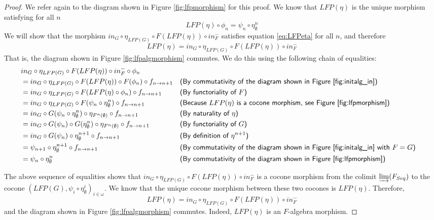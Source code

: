 \documentclass{msthesis}
\theoremstyle{definition}
\newcommand{\colim}{\varinjlim}
\begin{document}
\begin{proof}
    We refer again to the diagram shown in Figure \ref{fig:lfpmorphism} for this proof.  We know that $LFP(\eta)$ is the unique morphism satisfying for all $n$
    \begin{equation}
    \label{eq:LFPeta}      
 LFP(\eta) \circ \phi_n = \psi_n \circ \eta^n_\emptyset
     \end{equation}
    We will show that the morphism $in_G \circ \eta_{LFP(G)} \circ F(LFP(\eta)) \circ in^-_F$ satisfies equation \eqref{eq:LFPeta} for all $n$, and therefore
    \[ LFP(\eta) = in_G \circ \eta_{LFP(G)} \circ F(LFP(\eta)) \circ in^-_F \]
    That is, the diagram shown in Figure \ref{fig:lfpalgmorphism} commutes.
    We do this using the following chain of equalities:
   {\scriptsize \begin{align*}
        &in_G \circ \eta_{LFP(G)} \circ F(LFP(\eta)) \circ in^-_F \circ \phi_n  \\
        &= in_G \circ \eta_{LFP(G)} \circ F(LFP(\eta)) \circ F(\phi_n) \circ f_{n \to n+1} && \textsf{(By commutativity of the diagram shown in Figure \ref{fig:initalg_in})} \\
        &= in_G \circ \eta_{LFP(G)} \circ F(LFP(\eta) \circ \phi_n) \circ f_{n \to n+1} && \textsf{(By functoriality of $F$)} \\
        &= in_G \circ \eta_{LFP(G)} \circ F(\psi_n \circ \eta^n_\emptyset) \circ f_{n \to n+1} && \textsf{(Because $LFP(\eta)$ is a cocone morphism, see Figure \ref{fig:lfpmorphism})} \\
        &= in_G \circ G(\psi_n \circ \eta^n_\emptyset) \circ \eta_{F^n(\emptyset)} \circ f_{n \to n+1} && \textsf{(By naturality of $\eta$)} \\
        &= in_G \circ G(\psi_n) \circ G(\eta^n_\emptyset) \circ \eta_{F^n(\emptyset)} \circ f_{n \to n+1} && \textsf{(By functoriality of $G$)} \\
        &= in_G \circ G(\psi_n) \circ \eta^{n+1}_\emptyset \circ f_{n \to n+1}
        && \textsf{(By definition of $\eta^{n+1}$)} \\
        &= \psi_{n+1} \circ \eta^{n+1}_\emptyset \circ f_{n \to n+1} && \textsf{(By commutativity of the diagram shown in Figure \ref{fig:initalg_in} with $F=G$)} \\
        &= \psi_n \circ \eta^n_\emptyset && \textsf{(By commutativity of the diagram shown in Figure \ref{fig:lfpmorphism})}
    \end{align*} }

    The above sequence of equalities shows that $in_G \circ \eta_{LFP(G)} \circ F(LFP(\eta)) \circ in^-_F$ is a cocone morphism from the colimit $\colim(F_{Seq})$ to the cocone $(LFP(G), \psi_i \circ \eta^i_\emptyset)_{i \in \omega}$.  We know that the unique cocone morphism between these two cocones is $LFP(\eta)$.  Therefore, 
    \[ LFP(\eta) = in_G \circ \eta_{LFP(G)} \circ F(LFP(\eta)) \circ in^-_F \]
    and the diagram shown in Figure \ref{fig:lfpalgmorphism} commutes.
    Indeed, $LFP(\eta)$ is an $F$-algebra morphism.
    
\end{proof}
\end{document}
